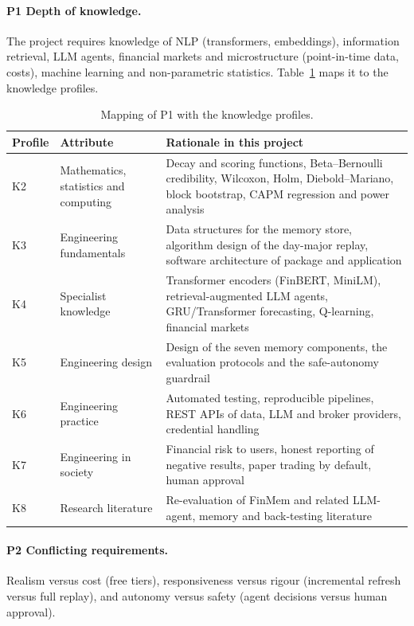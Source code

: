 \paragraph{P1 Depth of knowledge.} The project requires knowledge of NLP (transformers, embeddings), information retrieval, LLM agents, financial markets and microstructure (point-in-time data, costs), machine learning and non-parametric statistics. Table~\ref{tab:k_profile} maps it to the knowledge profiles.
\begin{table}[H]
\centering
\caption{Mapping of P1 with the knowledge profiles.}
\label{tab:k_profile}
\small
\begin{tabular}{|p{}|p{}|p{}|}
\hline
Profile & Attribute & Rationale in this project \\
\hline
K2 & Mathematics, statistics and computing & Decay and scoring functions, Beta--Bernoulli credibility, Wilcoxon, Holm, Diebold--Mariano, block bootstrap, CAPM regression and power analysis \\
K3 & Engineering fundamentals & Data structures for the memory store, algorithm design of the day-major replay, software architecture of package and application \\
K4 & Specialist knowledge & Transformer encoders (FinBERT, MiniLM), retrieval-augmented LLM agents, GRU/Transformer forecasting, Q-learning, financial markets \\
K5 & Engineering design & Design of the seven memory components, the evaluation protocols and the safe-autonomy guardrail \\
K6 & Engineering practice & Automated testing, reproducible pipelines, REST APIs of data, LLM and broker providers, credential handling \\
K7 & Engineering in society & Financial risk to users, honest reporting of negative results, paper trading by default, human approval \\
K8 & Research literature & Re-evaluation of FinMem and related LLM-agent, memory and back-testing literature \\
\hline
\end{tabular}
\end{table}
\paragraph{P2 Conflicting requirements.} Realism versus cost (free tiers), responsiveness versus rigour (incremental refresh versus full replay), and autonomy versus safety (agent decisions versus human approval).
